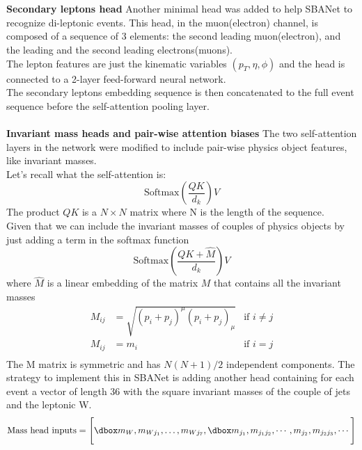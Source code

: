 \\  
\\
\textbf{Secondary leptons head} Another minimal head was added to help SBANet to recognize di-leptonic events. This head, in the muon(electron) channel, is composed of a sequence of 3 elements: the second leading muon(electron), and the leading and the second leading electrons(muons).\\
The lepton features are just the kinematic variables $(p_T,\eta,\phi)$ and the head is connected to a 2-layer feed-forward neural network.\\
The secondary leptons embedding sequence is then concatenated to the full event sequence before the self-attention pooling layer.
\\
\\
\textbf{Invariant mass heads and pair-wise attention biases} The two self-attention layers in the network were modified to include pair-wise physics object features, like invariant masses.\\
Let's recall what the self-attention is:
\begin{equation}
    \text{Softmax}\left( \frac{QK}{d_k} \right)V
\end{equation}
The product $QK$ is a $N\times N$ matrix where N is the length of the sequence.\\
Given that we can include the invariant masses of couples of physics objects by just adding a term in the softmax function
\begin{equation}
    \text{Softmax}\left( \frac{QK+\hat{M}}{d_k} \right)V
\end{equation}
where $\hat{M}$ is a linear embedding of the matrix $M$ that contains all the invariant masses
\begin{equation}
\begin{aligned}
    M_{ij}&=\sqrt{(p_i+p_j)^\mu(p_i+p_j)_\mu} & \text{if } i\neq j\\
    M_{ij}&=m_i & \text{if } i=j\\
\end{aligned}
\end{equation}
The M matrix is symmetric and has $N(N+1)/2$ independent components. The strategy to implement this in SBANet is adding another head containing for each event a vector of length 36 with the square invariant masses of the couple of jets and the leptonic W.
\begin{equation*}
    \text{Mass head inputs}=\Biggl[ \dboxed{m_W,m_{Wj_1},\dots,m_{Wj_7},\dboxed{m_{j_1},m_{j_1 j_2},\cdots,m_{j_2},m_{j_2 j_3},\cdots}}\: \Biggr]
\end{equation*}
